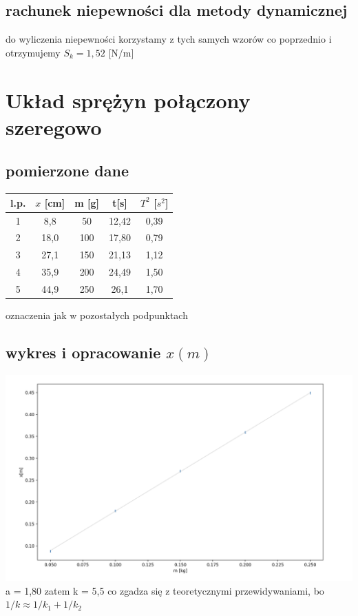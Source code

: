 \documentclass{article}
\begin{document}
\subsection{rachunek niepewności dla metody dynamicznej}
do wyliczenia niepewności korzystamy z tych samych wzorów co poprzednio i otrzymujemy
$S_k = 1, 52$ [N/m]

\section{Układ sprężyn połączony szeregowo}
\subsection{pomierzone dane}
\begin{center}
\begin{tabular}{ c | c | c | c | c  }
l.p. & $x$ [cm] & m [g] & t[s]  & $T^2$ [$s^2$]\\
\hline
 1 & 8,8   & 50 & 12,42 & 0,39\\ 
 2 & 18,0   & 100 &17,80 & 0,79\\ 
 3 & 27,1   & 150 & 21,13 & 1,12\\ 
 4 & 35,9  & 200 & 24,49 & 1,50\\
 5 & 44,9 & 250 & 26,1 & 1,70\\


\end{tabular}
\end{center}
oznaczenia jak w pozostałych podpunktach

\subsection{wykres i opracowanie $x(m)$}
\includegraphics[width=15cm]{m7_5a}
a = 1,80 zatem k = 5,5 co zgadza się z teoretycznymi przewidywaniami, bo $1/k \approx 1/k_1 + 1/k_2$
\end{document}
